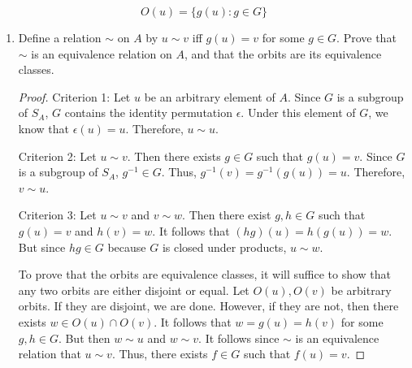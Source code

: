 \documentclass[../notes.tex]{subfiles}
\begin{document}
\begin{enumerate}[label={\textbf{\Alph*.}}]
\begin{equation*}
        O(u) = \{g(u):g\in G\}
    \end{equation*}
    \begin{enumerate}
        \item Define a relation $\sim$ on $A$ by $u\sim v$ iff $g(u)=v$ for some $g\in G$. Prove that $\sim$ is an equivalence relation on $A$, and that the orbits are its equivalence classes.
        \begin{proof}
            Criterion 1: Let $u$ be an arbitrary element of $A$. Since $G$ is a subgroup of $S_A$, $G$ contains the identity permutation $\epsilon$. Under this element of $G$, we know that $\epsilon(u)=u$. Therefore, $u\sim u$.\par
            Criterion 2: Let $u\sim v$. Then there exists $g\in G$ such that $g(u)=v$. Since $G$ is a subgroup of $S_A$, $g^{-1}\in G$. Thus, $g^{-1}(v)=g^{-1}(g(u))=u$. Therefore, $v\sim u$.\par
            Criterion 3: Let $u\sim v$ and $v\sim w$. Then there exist $g,h\in G$ such that $g(u)=v$ and $h(v)=w$. It follows that $(hg)(u)=h(g(u))=w$. But since $hg\in G$ because $G$ is closed under products, $u\sim w$.\par\smallskip
            To prove that the orbits are equivalence classes, it will suffice to show that any two orbits are either disjoint or equal. Let $O(u),O(v)$ be arbitrary orbits. If they are disjoint, we are done. However, if they are not, then there exists $w\in O(u)\cap O(v)$. It follows that $w=g(u)=h(v)$ for some $g,h\in G$. But then $w\sim u$ and $w\sim v$. It follows since $\sim$ is an equivalence relation that $u\sim v$. Thus, there exists $f\in G$ such that $f(u)=v$.
        \end{proof}
    \end{enumerate}
\end{enumerate}
\end{document}
